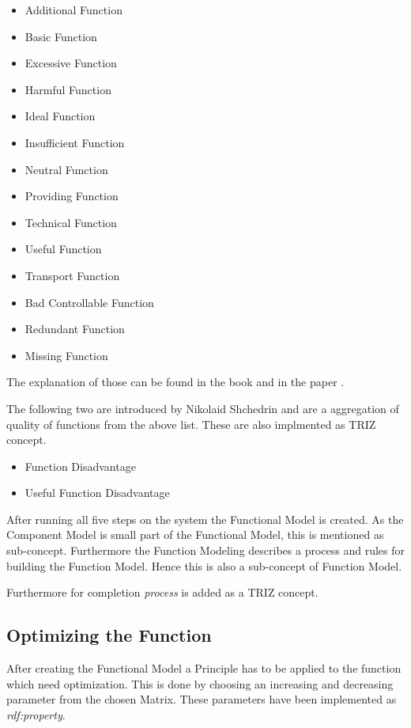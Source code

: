 \documentclass[11pt,a4paper]{article}
\begin{document}
\begin{itemize}
\item Additional Function
\item Basic Function
\item Excessive Function
\item Harmful Function
\item Ideal Function
\item Insufficient Function
\item Neutral Function
\item Providing Function
\item Technical Function
\item Useful Function
\item Transport Function
\item Bad Controllable Function
\item Redundant Function
\item Missing Function
\end{itemize}

The explanation of those can be found in the book \cite{KS} and in the paper
\cite{WebinarFunctionAnalysis}.

The following two are introduced by Nikolaid Shchedrin and are a aggregation
of quality of functions from the above list.  These are also implmented as
TRIZ concept.

\begin{itemize}
\item Function Disadvantage
\item Useful Function Disadvantage
\end{itemize}

After running all five steps on the system the Functional Model is created.
As the Component Model is small part of the Functional Model, this is
mentioned as sub-concept.  Furthermore the Function Modeling describes a
process and rules for building the Function Model.  Hence this is also a
sub-concept of Function Model.

Furthermore for completion \emph{process} is added as a TRIZ concept. 

\subsection{Optimizing the Function}

After creating the Functional Model a Principle has to be applied to the
function which need optimization.  This is done by choosing an increasing and
decreasing parameter from the chosen Matrix.  These parameters have been
implemented as \emph{rdf:property}.
\end{document}
